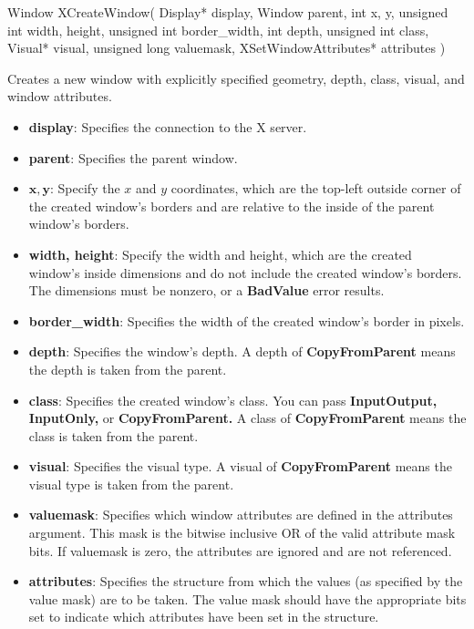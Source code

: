 \documentclass{report}
\begin{document}
\begin{itemize}
            \begin{cppcode}
                Window XCreateWindow(
                    Display* display, 
                    Window parent,
                    int x, y, 
                    unsigned int width, height, 
                    unsigned int border_width,
                    int depth,
                    unsigned int class,
                    Visual* visual,
                    unsigned long valuemask,
                    XSetWindowAttributes* attributes
                )
            \end{cppcode}
            \bigbreak \noindent
            Creates a new window with explicitly specified geometry, depth, class, visual, and window attributes.
            \begin{itemize}
                \item \textbf{display}: Specifies the connection to the X server.
                \item \textbf{parent}: Specifies the parent window.
                \item \textbf{$\mathbf{x}, \mathbf{y}$}: Specify the $x$ and $y$ coordinates, which are the top-left outside corner of the created window’s borders and are relative to the inside of the parent window’s borders.
                \item \textbf{width, height}: Specify the width and height, which are the created window’s inside dimensions and do not include the created window’s borders. The dimensions must be nonzero, or a \textbf{BadValue} error results.
                \item \textbf{border\_width}: Specifies the width of the created window’s border in pixels.
                \item \textbf{depth}: Specifies the window’s depth. A depth of \textbf{CopyFromParent} means the depth is taken from the parent.
                \item \textbf{class}: Specifies the created window’s class. You can pass \textbf{InputOutput,} \textbf{InputOnly,} or \textbf{CopyFromParent.} A class of \textbf{CopyFromParent} means the class is taken from the parent.
                \item \textbf{visual}: Specifies the visual type. A visual of \textbf{CopyFromParent} means the visual type is taken from the parent.
                \item \textbf{valuemask}: Specifies which window attributes are defined in the attributes argument. This mask is the bitwise inclusive OR of the valid attribute mask bits. If valuemask is zero, the attributes are ignored and are not referenced.
                \item \textbf{attributes}: Specifies the structure from which the values (as specified by the value mask) are to be taken. The value mask should have the appropriate bits set to indicate which attributes have been set in the structure.
            \end{itemize}


\end{itemize}
\end{document}

